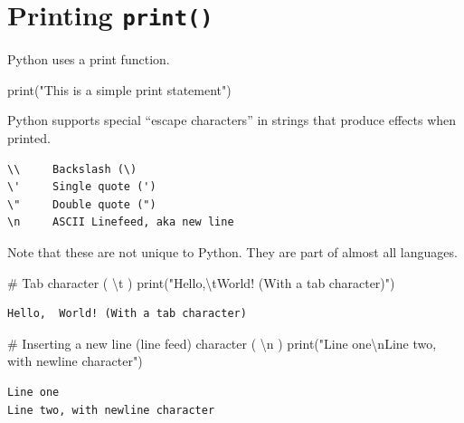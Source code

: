 \documentclass[
  letterpaper,
  DIV=11,
  numbers=noendperiod]{scrreprt}
\newenvironment{Shaded}{\begin{snugshade}}{\end{snugshade}}
\newcommand{\BuiltInTok}[1]{\textcolor[rgb]{0.00,0.23,0.31}{#1}}
\newcommand{\CharTok}[1]{\textcolor[rgb]{0.13,0.47,0.30}{#1}}
\newcommand{\CommentTok}[1]{\textcolor[rgb]{0.37,0.37,0.37}{#1}}
\newcommand{\NormalTok}[1]{\textcolor[rgb]{0.00,0.23,0.31}{#1}}
\newcommand{\StringTok}[1]{\textcolor[rgb]{0.13,0.47,0.30}{#1}}
\begin{document}
\hypertarget{printing-print}{%
\chapter{\texorpdfstring{Printing
\texttt{print()}}{Printing print()}}\label{printing-print}}

Python uses a print function.

\begin{Shaded}
\begin{Highlighting}[]
\BuiltInTok{print}\NormalTok{(}\StringTok{"This is a simple print statement"}\NormalTok{)}
\end{Highlighting}
\end{Shaded}

Python supports special ``escape characters'' in strings that produce
effects when printed.

\begin{verbatim}
\\     Backslash (\)
\'     Single quote (')
\"     Double quote (")
\n     ASCII Linefeed, aka new line
\end{verbatim}

Note that these are not unique to Python. They are part of almost all
languages.

\begin{Shaded}
\begin{Highlighting}[]
\CommentTok{\# Tab character ( \textbackslash{}t )}
\BuiltInTok{print}\NormalTok{(}\StringTok{"Hello,}\CharTok{\textbackslash{}t}\StringTok{World! (With a tab character)"}\NormalTok{)}
\end{Highlighting}
\end{Shaded}

\begin{verbatim}
Hello,  World! (With a tab character)
\end{verbatim}

\begin{Shaded}
\begin{Highlighting}[]
\CommentTok{\# Inserting a new line (line feed) character ( \textbackslash{}n )}
\BuiltInTok{print}\NormalTok{(}\StringTok{"Line one}\CharTok{\textbackslash{}n}\StringTok{Line two, with newline character"}\NormalTok{)}
\end{Highlighting}
\end{Shaded}

\begin{verbatim}
Line one
Line two, with newline character
\end{verbatim}
\end{document}
